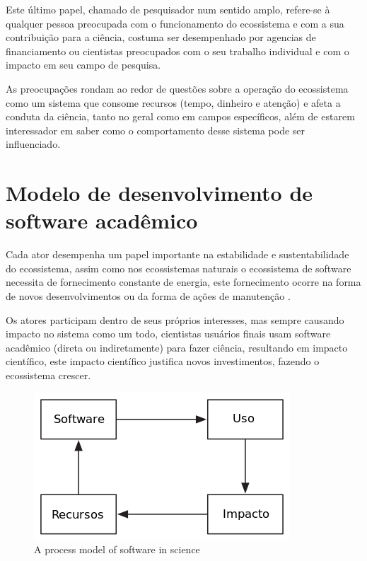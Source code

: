 Este último papel, chamado de pesquisador num sentido amplo, refere-se à
qualquer pessoa preocupada com o funcionamento do ecossistema e com a sua
contribuição para a ciência, costuma ser desempenhado por agencias de
financiamento ou cientistas preocupados com o seu trabalho individual e com o
impacto em seu campo de pesquisa.

As preocupações rondam ao redor de questões sobre a operação do ecossistema
como um sistema que consome recursos (tempo, dinheiro e atenção) e afeta a
conduta da ciência, tanto no geral como em campos específicos, além de estarem
interessador em saber como o comportamento desse sistema pode ser influenciado.

\section{Modelo de desenvolvimento de software acadêmico}


Cada ator desempenha um papel importante na estabilidade e sustentabilidade do
ecossistema, assim como nos ecossistemas naturais o ecossistema de software
necessita de fornecimento constante de energia, este fornecimento ocorre na
forma de novos desenvolvimentos ou da forma de ações de manutenção
\cite{dhungana2010software}.

Os atores participam dentro de seus próprios interesses, mas sempre causando
impacto no sistema como um todo, cientistas usuários finais usam software
acadêmico (direta ou indiretamente) para fazer ciência, resultando em impacto
científico, este impacto científico justifica novos investimentos, fazendo o
ecossistema crescer.


\begin{figure}[h]
  \center
  \includegraphics[scale=0.5]{imagens/process-model-scientific-software-dia.png}
  \caption{A process model of software in science \cite{howison2015understanding}}
  \label{process-model-scientific-software}
\end{figure}


